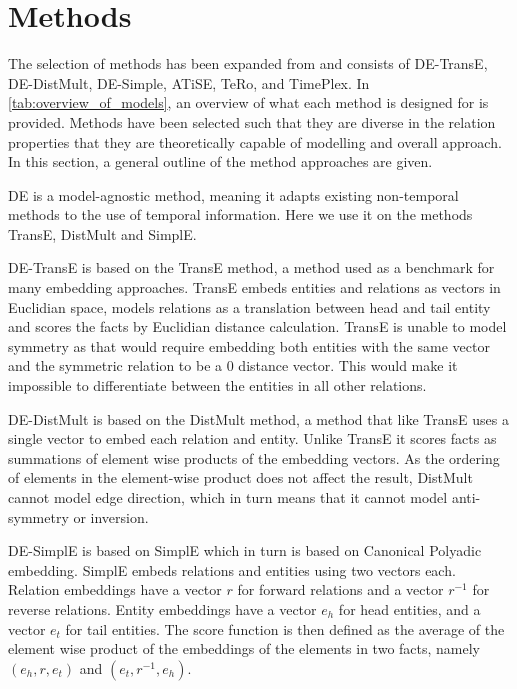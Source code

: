 \section{Methods}
\label{sec:methods}

The selection of methods has been expanded from \cite{P9} and consists of DE-TransE, DE-DistMult, DE-Simple, ATiSE, TeRo, and TimePlex. 
In \autoref{tab:overview_of_models}, an overview of what each method is designed for is provided. Methods have been selected such that they are diverse in the relation properties that they are theoretically capable of modelling and overall approach.
In this section, a general outline of the method approaches are given. 


DE is a model-agnostic method, meaning it adapts existing non-temporal methods to the use of temporal information. Here we use it on the methods TransE, DistMult and SimplE.

DE-TransE is based on the TransE \cite{bordes2013transe} method, a method used as a benchmark for many embedding approaches. 
TransE embeds entities and relations as vectors in Euclidian space, 
models relations as a translation between head and tail entity and scores the facts by Euclidian distance calculation.
TransE is unable to model symmetry as that would require embedding both entities with the same vector and the symmetric relation to be a 0 distance vector. This would make it impossible to differentiate between the entities in all other relations.

DE-DistMult is based on the DistMult \cite{yang2015distmult} method, a method that like TransE uses a single vector to embed each relation and entity. Unlike TransE it scores facts as summations of element wise products of the embedding vectors.
As the ordering of elements in the element-wise product does not affect the result, DistMult cannot model edge direction, which in turn means that it cannot model anti-symmetry or inversion.

DE-SimplE is based on SimplE \cite{kazemi2018simple} which in turn is based on Canonical Polyadic \cite{hitchcock1927cp} embedding. 
SimplE embeds relations and entities using two vectors each. Relation embeddings have a vector $r$ for forward relations and a vector $r^{-1}$ for reverse relations. Entity embeddings have a vector $e_h$ for head entities, and a vector $e_t$ for tail entities.
The score function is then defined as the average of the element wise product of the embeddings of the elements in two facts, namely $(e_h, r, e_t)$ and $(e_t, r^{-1}, e_h)$.

